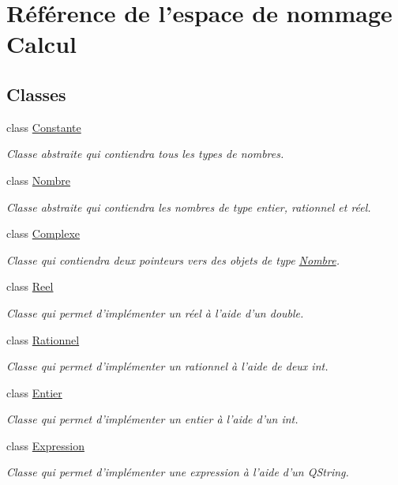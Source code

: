 \hypertarget{namespace_calcul}{\section{Référence de l'espace de nommage Calcul}
\label{namespace_calcul}
}
\subsection*{Classes}
\begin{DoxyCompactItemize}
\item 
class \hyperlink{class_calcul_1_1_constante}{Constante}
\begin{DoxyCompactList}\small\item\em Classe abstraite qui contiendra tous les types de nombres. \end{DoxyCompactList}\item 
class \hyperlink{class_calcul_1_1_nombre}{Nombre}
\begin{DoxyCompactList}\small\item\em Classe abstraite qui contiendra les nombres de type entier, rationnel et réel. \end{DoxyCompactList}\item 
class \hyperlink{class_calcul_1_1_complexe}{Complexe}
\begin{DoxyCompactList}\small\item\em Classe qui contiendra deux pointeurs vers des objets de type \hyperlink{class_calcul_1_1_nombre}{Nombre}. \end{DoxyCompactList}\item 
class \hyperlink{class_calcul_1_1_reel}{Reel}
\begin{DoxyCompactList}\small\item\em Classe qui permet d'implémenter un réel à l'aide d'un double. \end{DoxyCompactList}\item 
class \hyperlink{class_calcul_1_1_rationnel}{Rationnel}
\begin{DoxyCompactList}\small\item\em Classe qui permet d'implémenter un rationnel à l'aide de deux int. \end{DoxyCompactList}\item 
class \hyperlink{class_calcul_1_1_entier}{Entier}
\begin{DoxyCompactList}\small\item\em Classe qui permet d'implémenter un entier à l'aide d'un int. \end{DoxyCompactList}\item 
class \hyperlink{class_calcul_1_1_expression}{Expression}
\begin{DoxyCompactList}\small\item\em Classe qui permet d'implémenter une expression à l'aide d'un Q\-String. \end{DoxyCompactList}\end{DoxyCompactItemize}
